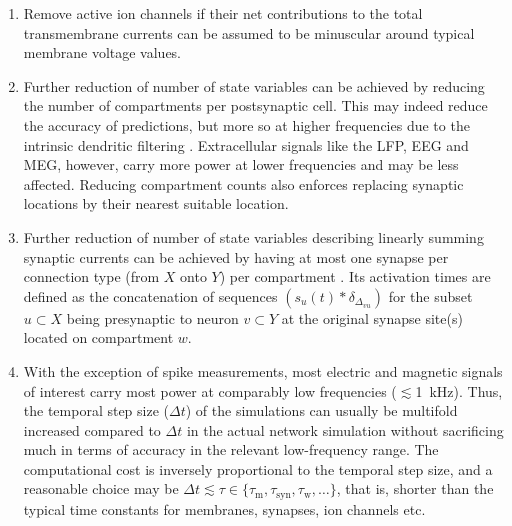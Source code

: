 \begin{enumerate}
\item Remove active ion channels  if their net contributions to the total transmembrane currents can be assumed to be minuscular around typical membrane voltage values. 

\item Further reduction of number of state variables 
can be achieved by reducing the number of compartments per postsynaptic cell. 
This may indeed reduce the accuracy of  predictions, 
but more so at higher frequencies due to the intrinsic dendritic filtering . 
Extracellular signals like the LFP, EEG and MEG, however, carry more power at lower frequencies and may be less affected. 
Reducing compartment counts also enforces replacing synaptic locations by their nearest suitable location.

\item Further reduction of number of state variables describing linearly summing synaptic currents can be achieved by having at most one synapse per connection type (from $X$ onto $Y$) per compartment .
Its activation times are defined as the concatenation of sequences $\left(s_u(t) \ast \delta_{\Delta_{vu}}\right)$ for the subset $u \subset X$ being presynaptic to neuron $v \subset Y$ at the original synapse site(s) located on compartment $w$. 

\item With the exception of spike measurements, most electric and magnetic signals of interest carry most power at comparably low frequencies ($\lesssim$\SI{1}{\kilo\hertz}).
Thus, the temporal step size ($\Delta t$) of the simulations can usually be multifold increased compared to $\Delta t$ in the actual network simulation without sacrificing much in terms of accuracy in the relevant low-frequency range.
The computational cost is inversely proportional to the temporal step size,
and a reasonable choice may be $\Delta t \lesssim \tau \in \{ \tau_\text{m}, \tau_\text{syn}, \tau_\text{w}, \ldots \}$,
that is, shorter than the typical time constants for membranes, synapses, ion channels etc. 

\end{enumerate}

